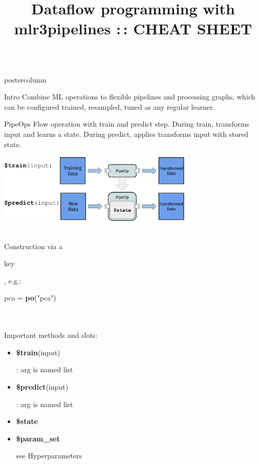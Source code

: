 \documentclass{beamer}
\title{Dataflow programming with mlr3pipelines :\,: CHEAT SHEET} %
\newlength{\columnheight} %
\newcommand{\codeinline}[1]{\begin{codeboxinline}#1\end{codeboxinline}}
\begin{document}
\begin{frame}[fragile]{}
	\begin{columns}
		\begin{column}{.245\textwidth}
			\begin{beamercolorbox}[center]{postercolumn}
				\begin{minipage}{.98\textwidth}
					\parbox[t][\columnheight]{\textwidth}{
						\begin{myblock}{Intro}
              Combine ML operations to flexible pipelines and processing graphs, 
              which can be configured trained, resampled, tuned as any regular learner.
            \end{myblock}
						\begin{myblock}{PipeOps}
              Flow operation with train and predict step. During train, transforms input and learns a state. During predict, applies transforms input with stored state.
              \begin{center}
                \includegraphics[width=0.7\textwidth]{img/po.pdf}
              \end{center}
              \ \\
              Construction via a \codeinline{key}, e.g.: \codeinline{pca = \textbf{po}("pca")} \\
              \ \\
              Important methods and slots:
              \begin{itemize}
                \item \codeinline{\textbf{\$train}(input)}: arg is named list
                \item \codeinline{\textbf{\$predict}(input)}: arg is named list
                \item \codeinline{\textbf{\$state}} 
                \item \codeinline{\textbf{\$param\_set}} see Hyperparameters

\end{itemize}
\end{myblock}}
\end{minipage}
\end{beamercolorbox}
\end{column}
\end{columns}
\end{frame}
\end{document}
